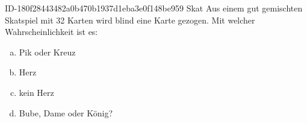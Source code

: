 \begin{exercise}
      {ID-180f28443482a0b470b1937d1eba3e0f148be959}
      {Skat}
  \ifproblem\problem
    Aus einem gut gemischten Skatspiel mit 32 Karten wird blind eine Karte gezogen.
    Mit welcher Wahrscheinlichkeit ist es:
    \begin{center}
      \begin{minipage}{0.38\textwidth}
        \begin{enumerate}[a)]
          \item Pik oder Kreuz
          \item Herz
        \end{enumerate}
      \end{minipage}%
      \begin{minipage}{0.38\textwidth}
        \begin{enumerate}[a)]
          \setcounter{enumi}{2}
          \item kein Herz
          \item Bube, Dame oder König?
        \end{enumerate}
      \end{minipage}
    \end{center}
  \fi
\end{exercise}

